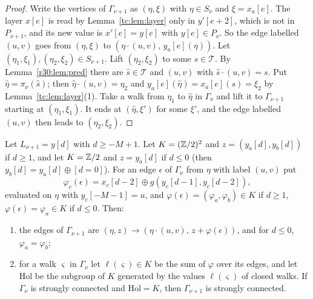 \begin{proof}
Write the vertices of $\Gamma_{\nu+1}$ as $(\eta,\xi)$ with $\eta\in S_\nu$ and $\xi=x_a[e]$. The layer $x[e]$ is read by Lemma~\ref{tc:lem:layer} only in $y'[e+2]$, which is not in $P_{\nu+1}$, and its new value is $x'[e]=y[e]$ with $y[e]\in P_\nu$. So the edge labelled $(u,v)$ goes from $(\eta,\xi)$ to $(\eta\cdot(u,v),\,y_a[e](\eta))$. Let $(\eta_1,\xi_1),(\eta_2,\xi_2)\in S_{\nu+1}$. Lift $(\eta_2,\xi_2)$ to some $s\in\mathcal{T}$. By Lemma~\ref{r30:lem:pred} there are $\hat s\in\mathcal{T}$ and $(u,v)$ with $\hat s\cdot(u,v)=s$. Put $\hat\eta=\pi_\nu(\hat s)$; then $\hat\eta\cdot(u,v)=\eta_2$ and $y_a[e](\hat\eta)=x_a[e](s)=\xi_2$ by Lemma~\ref{tc:lem:layer}(1). Take a walk from $\eta_1$ to $\hat\eta$ in $\Gamma_\nu$ and lift it to $\Gamma_{\nu+1}$ starting at $(\eta_1,\xi_1)$. It ends at $(\hat\eta,\xi')$ for some $\xi'$, and the edge labelled $(u,v)$ then leads to $(\eta_2,\xi_2)$.
\end{proof}

\begin{lemma}\label{r30:lem:ystep}
Let $L_{\nu+1}=y[d]$ with $d\ge-M+1$. Let $K=(\mathbb{Z}/2)^2$ and $z=(y_a[d],y_b[d])$ if $d\ge1$, and let $K=\mathbb{Z}/2$ and $z=y_a[d]$ if $d\le0$ (then $y_b[d]=y_a[d]\oplus[d=0]$). For an edge $\epsilon$ of $\Gamma_\nu$ from $\eta$ with label $(u,v)$ put
\begin{equation}\label{pm:eq:phi}
\varphi_c(\epsilon)=x_c[d-2]\oplus g(y_c[d-1],y_c[d-2]),
\end{equation}
evaluated on $\eta$ with $y_c[-M-1]=u$, and $\varphi(\epsilon)=(\varphi_a,\varphi_b)\in K$ if $d\ge1$, $\varphi(\epsilon)=\varphi_a\in K$ if $d\le0$. Then:
\begin{enumerate}
\item the edges of $\Gamma_{\nu+1}$ are $(\eta,z)\to(\eta\cdot(u,v),\,z+\varphi(\epsilon))$, and for $d\le0$, $\varphi_a=\varphi_b$;
\item for a walk $\varsigma$ in $\Gamma_\nu$ let $\ell(\varsigma)\in K$ be the sum of $\varphi$ over its edges, and let $\mathrm{Hol}$ be the subgroup of $K$ generated by the values $\ell(\varsigma)$ of closed walks. If $\Gamma_\nu$ is strongly connected and $\mathrm{Hol}=K$, then $\Gamma_{\nu+1}$ is strongly connected.
\end{enumerate}
\end{lemma}

